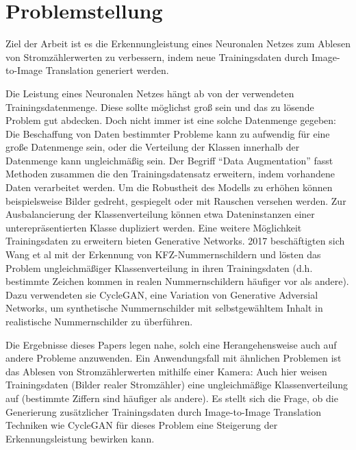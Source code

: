 \chapter*{Problemstellung}
Ziel der Arbeit ist es die Erkennungleistung eines Neuronalen Netzes zum Ablesen von Stromzählerwerten zu verbessern, indem
neue Trainingsdaten durch Image-to-Image Translation generiert werden.

Die Leistung eines Neuronalen Netzes hängt ab von der verwendeten Trainingsdatenmenge. Diese sollte möglichst groß sein und das zu lösende Problem gut abdecken.
Doch nicht immer ist eine solche Datenmenge gegeben: Die Beschaffung von Daten bestimmter Probleme kann zu aufwendig für eine große Datenmenge sein,
oder die Verteilung der Klassen innerhalb der Datenmenge kann ungleichmäßig sein.
Der Begriff "`Data Augmentation"' fasst Methoden zusammen die den Trainingsdatensatz erweitern, indem vorhandene Daten verarbeitet werden.
Um die Robustheit des Modells zu erhöhen können beispielsweise Bilder gedreht, gespiegelt oder mit Rauschen versehen werden.
Zur Ausbalancierung der Klassenverteilung können etwa Dateninstanzen einer unterepräsentierten Klasse dupliziert werden.
Eine weitere Möglichkeit Trainingsdaten zu erweitern bieten Generative Networks.
2017 beschäftigten sich Wang et al\cite{lplate} mit der Erkennung von KFZ-Nummernschildern und lösten das Problem ungleichmäßiger Klassenverteilung in ihren Trainingsdaten
(d.h. bestimmte Zeichen kommen in realen Nummernschildern häufiger vor als andere). Dazu verwendeten sie CycleGAN\cite{cyclegan}, eine Variation von Generative Adversial Networks,
um synthetische Nummernschilder mit selbstgewähltem Inhalt in realistische Nummernschilder zu überführen.

Die Ergebnisse dieses Papers legen nahe, solch eine Herangehensweise auch auf andere Probleme anzuwenden.
Ein Anwendungsfall mit ähnlichen Problemen ist das Ablesen von Stromzählerwerten mithilfe einer Kamera: Auch hier weisen Trainingsdaten (Bilder realer Stromzähler)
eine ungleichmäßige Klassenverteilung auf (bestimmte Ziffern sind häufiger als andere).
Es stellt sich die Frage, ob die Generierung zusätzlicher Trainingsdaten durch Image-to-Image Translation Techniken wie CycleGAN für dieses Problem 
eine Steigerung der Erkennungsleistung bewirken kann.